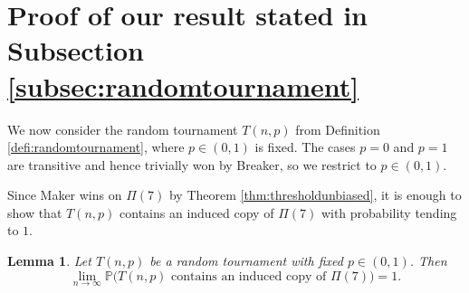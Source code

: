 \documentclass{article}
\theoremstyle{definition}
\theoremstyle{plain}
\newtheorem{lem}[theo]{Lemma}
\theoremstyle{remark}
\theoremstyle{definition}
\begin{document}
\section{Proof of our result stated in Subsection \ref{subsec:randomtournament}}

We now consider the random tournament $T(n,p)$ from Definition \ref{defi:randomtournament}, where
$p\in(0,1)$ is fixed.
The cases $p=0$ and $p=1$ are transitive and hence trivially won by Breaker, so we restrict to $p\in(0,1)$.

Since Maker wins on $\Pi(7)$ by Theorem \ref{thm:thresholdunbiased}, it is enough to show that
$T(n,p)$ contains an induced copy of $\Pi(7)$ with probability tending to $1$.

\begin{lem}\label{lem:existence}
Let $T(n,p)$ be a random tournament with fixed $p\in(0,1)$.
Then
\[
\lim_{n\to\infty}\mathbb P\bigl(T(n,p)\text{ contains an induced copy of }\Pi(7)\bigr)=1.
\]
\end{lem}
\end{document}
